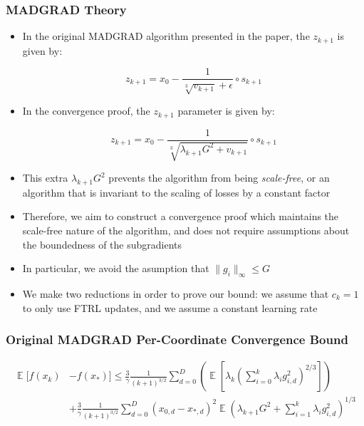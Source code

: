 \documentclass{beamer}
\newcommand{\E}{\mathop{\mathbb{E}}}
\begin{document}
\begin{frame}[shrink=15]
  \frametitle{MADGRAD Theory}
    \begin{itemize}
      \item In the original MADGRAD algorithm presented in the paper, the $z_{k+1}$ is given by:

      \[
        z_{k+1} = x_0 - \frac{1}{\sqrt[3]{v_{k+1}} + \epsilon} \circ s_{k+1}
      \]

      \item In the convergence proof, the $z_{k+1}$ parameter is given by:

      \[
        z_{k+1} = x_0 - \frac{1}{\sqrt[3]{\lambda_{k+1}G^2 + v_{k+1}}} \circ s_{k+1}
      \]

      \item This extra $\lambda_{k+1} G^2$ prevents the algorithm from being \emph{scale-free}, or an algorithm that is
        invariant to the scaling of losses by a constant factor
      \item Therefore, we aim to construct a convergence proof which maintains the scale-free nature of the algorithm,
        and does not require assumptions about the boundedness of the subgradients
      \item In particular, we avoid the asumption that $\|g_i\|_{\infty} \leq G$
      \item We make two reductions in order to prove our bound: we assume that $c_k = 1$ to only use FTRL updates, and
        we assume a constant learning rate
    \end{itemize}
\end{frame}

\begin{frame}
  \frametitle{Original MADGRAD Per-Coordinate Convergence Bound}
  \begin{align*}
    \E[f(x_k) 
    &- f(x_*)] \leq \frac{3}{\gamma}\frac{1}{(k+1)^{3/2}}\sum\limits_{d=0}^D\left(\E\left[\lambda_k
    \left(\sum\limits_{i=0}^k \lambda_i g_{i,d}^2\right)^{2/3}\right]\right) \\
    &+\frac{3}{\gamma}\frac{1}{(k+1)^{3/2}}\sum\limits_{d=0}^D(x_{0,d} - x_{*,d})^2\E\left(\lambda_{k+1}G^2 +
    \sum\limits_{i=1}^k\lambda_i g_{i,d}^2\right)^{1/3}
  \end{align*}
\end{frame}
\end{document}
